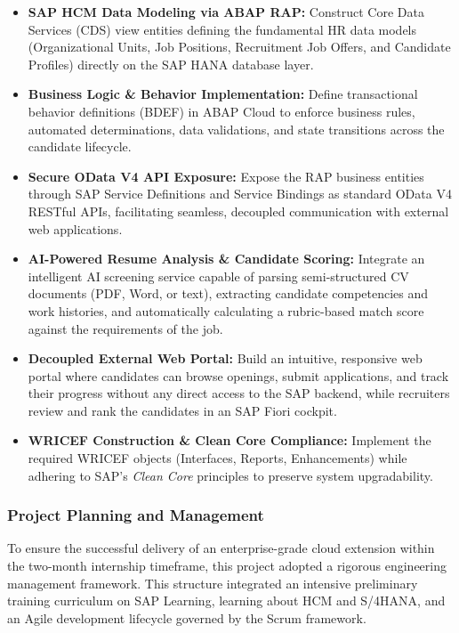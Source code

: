 \begin{itemize}
    \item \textbf{SAP HCM Data Modeling via ABAP RAP:} Construct Core Data Services (CDS) view entities defining the fundamental HR data models (Organizational Units, Job Positions, Recruitment Job Offers, and Candidate Profiles) directly on the SAP HANA database layer.
    
    \item \textbf{Business Logic \& Behavior Implementation:} Define transactional behavior definitions (BDEF) in ABAP Cloud to enforce business rules, automated determinations, data validations, and state transitions across the candidate lifecycle.

    \item \textbf{Secure OData V4 API Exposure:} Expose the RAP business entities through SAP Service Definitions and Service Bindings as standard OData V4 RESTful APIs, facilitating seamless, decoupled communication with external web applications.

    \item \textbf{AI-Powered Resume Analysis \& Candidate Scoring:} Integrate an intelligent AI screening service capable of parsing semi-structured CV documents (PDF, Word, or text), extracting candidate competencies and work histories, and automatically calculating a rubric-based match score against the requirements of the job.

    \item \textbf{Decoupled External Web Portal:} Build an intuitive, responsive web portal where candidates can browse openings, submit applications, and track their progress without any direct access to the SAP backend, while recruiters review and rank the candidates in an SAP Fiori cockpit.

    \item \textbf{WRICEF Construction \& Clean Core Compliance:} Implement the required WRICEF objects (Interfaces, Reports, Enhancements) while adhering to SAP's \textit{Clean Core} principles to preserve system upgradability.
\end{itemize}

\subsubsection{Project Planning and Management}
\label{subsubsec:project_planning}

To ensure the successful delivery of an enterprise-grade cloud extension within the two-month internship timeframe, this project adopted a rigorous engineering management framework. This structure integrated an intensive preliminary training curriculum on SAP Learning, learning about HCM and S/4HANA, and an Agile development lifecycle governed by the Scrum framework.


